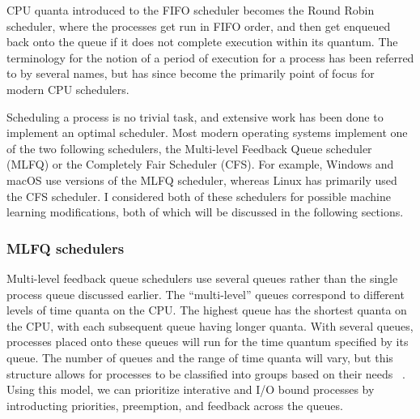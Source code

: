 \documentclass[12pt]{article}
\def\ind{\hspace*{0.3in}}
\begin{document}
CPU quanta introduced to the FIFO scheduler becomes the Round Robin scheduler, where the processes get run in FIFO order, and then get enqueued back onto the queue if it does not complete execution within its quantum. The terminology for the notion of a period of execution for a process has been referred to by several names, but has since become the primarily point of focus for modern CPU schedulers.

Scheduling a process is no trivial task, and extensive work has been done to implement an optimal scheduler. Most modern operating systems implement one of the two following schedulers, the Multi-level Feedback Queue scheduler (MLFQ) or the Completely Fair Scheduler (CFS). For example, Windows and macOS use versions of the MLFQ scheduler, whereas Linux has primarily used the CFS scheduler. I considered both of these schedulers for possible machine learning modifications, both of which will be discussed in the following sections.

\subsubsection*{MLFQ schedulers}

\ind Multi-level feedback queue schedulers use several queues rather than the single process queue discussed earlier. The ``multi-level'' queues correspond to different levels of time quanta on the CPU. The highest queue has the shortest quanta on the CPU, with each subsequent queue having longer quanta. With several queues, processes placed onto these queues will run for the time quantum specified by its queue. The number of queues and the range of time quanta will vary, but this structure allows for processes to be classified into groups based on their needs ~\cite{MultilevelQueue2018}. Using this model, we can prioritize interative and I/O bound processes by introducting priorities, preemption, and feedback across the queues.



{}

\end{document}

